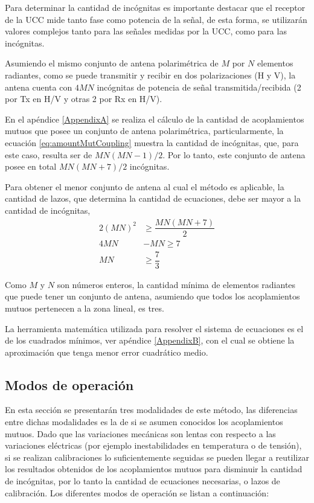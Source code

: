 Para determinar la cantidad de incógnitas es importante destacar que el receptor de la UCC mide tanto fase como potencia de la
señal, de esta forma, se utilizarán valores complejos tanto para las señales medidas por la UCC, como para las incógnitas.

Asumiendo el mismo conjunto de antena polarimétrica de $M$ por $N$ elementos radiantes, como se puede transmitir y recibir en
dos polarizaciones (H y V), la antena cuenta con $4MN$ incógnitas de potencia de señal transmitida/recibida (2 por Tx en H/V y
otras 2 por Rx en H/V).

En el apéndice \ref{AppendixA} se realiza el cálculo de la cantidad de acoplamientos mutuos que posee un conjunto de antena
polarimétrica, particularmente, la ecuación \ref{eq:amountMutCoupling} muestra la cantidad de incógnitas, que, para este caso,
resulta ser de $MN(MN-1)/2$. Por lo tanto, este conjunto de antena posee en total $MN(MN + 7)/2$ incógnitas.

Para obtener el menor conjunto de antena al cual el método es aplicable, la cantidad de lazos, que determina la cantidad de
ecuaciones, debe ser mayor a la cantidad de incógnitas, 
$$
\begin{aligned}
	2(MN)^2 &\ge  \dfrac{MN(MN + 7)}{2} \\
	4MN &- MN \ge7 \\
	MN &\ge \dfrac{7}{3}
\end{aligned}
$$

Como $M$ y $N$ son números enteros, la cantidad mínima de elementos radiantes que puede tener un conjunto de antena, asumiendo
que todos los acoplamientos mutuos pertenecen a la zona lineal, es tres.

La herramienta matemática utilizada para resolver el sistema de ecuaciones es el de los cuadrados mínimos,
ver apéndice \ref{AppendixB}, con el cual se obtiene la aproximación que tenga menor error cuadrático medio.


\subsection{Modos de operación}

En esta sección se presentarán tres modalidades de este método, las diferencias entre dichas modalidades es la de si se asumen
conocidos los acoplamientos mutuos. Dado que las variaciones mecánicas son lentas con respecto a las variaciones eléctricas
(por ejemplo inestabilidades en temperatura o de tensión), si se realizan calibraciones lo suficientemente seguidas se pueden
llegar a reutilizar los resultados obtenidos de los acoplamientos mutuos para disminuir la cantidad de incógnitas, por lo tanto
la cantidad de ecuaciones necesarias, o lazos de calibración. Los diferentes modos de operación se listan a continuación:

